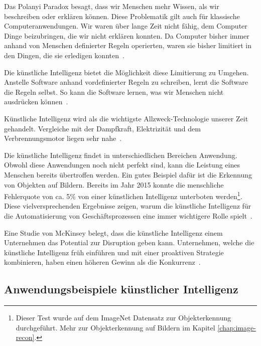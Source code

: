 Das Polanyi Paradox besagt, dass wir Menschen mehr Wissen, als wir beschreiben oder erklären können. Diese Problematik gilt auch für klassische Computeranwendungen. Wir waren über lange Zeit nicht fähig, dem Computer Dinge beizubringen, die wir nicht erklären konnten. Da Computer bisher immer anhand von Menschen definierter Regeln operierten, waren sie bisher limitiert in den Dingen, die sie erledigen konnten~\autocite{McAfee}. 

Die künstliche Intelligenz bietet die Möglichkeit diese Limitierung zu Umgehen. Anstelle Software anhand vordefinierter Regeln zu schreiben, lernt die Software die Regeln selbst. So kann die Software lernen, was wir Menschen nicht ausdrücken können~\autocite{McAfee}.

Künstliche Intelligenz wird als die wichtigste Allzweck-Technologie unserer Zeit gehandelt. Vergleiche mit der Dampfkraft, Elektrizität und dem Verbrennungsmotor liegen sehr nahe~\autocite{McAfee}.

Die künstliche Intelligenz findet in unterschiedlichen Bereichen Anwendung. Obwohl diese Anwendungen noch nicht perfekt sind, kann die Leistung eines Menschen bereits übertroffen werden. Ein gutes Beispiel dafür ist die Erkennung von Objekten auf Bildern. Bereits im Jahr 2015 konnte die menschliche Fehlerquote von ca. 5\% von einer künstlichen Intelligenz unterboten werden\footnote{Dieser Test wurde auf dem ImageNet Datensatz zur Objekterkennung durchgeführt. Mehr zur Objekterkennung auf Bildern im Kapitel \ref{chap:image-recon}.}. Diese vielversprechenden Ergebnisse zeigen, warum die künstliche Intelligenz für die Automatisierung von Geschäftsprozessen eine immer wichtigere Rolle spielt~\autocite{McAfee}.

Eine Studie von McKinsey belegt, dass die künstliche Intelligenz einem Unternehmen das Potential zur Disruption geben kann. Unternehmen, welche die künstliche Intelligenz früh einführen und mit einer proaktiven Strategie kombinieren, haben einen höheren Gewinn als die Konkurrenz~\autocite{Bughin}. 

\subsection{Anwendungsbeispiele künstlicher Intelligenz}


